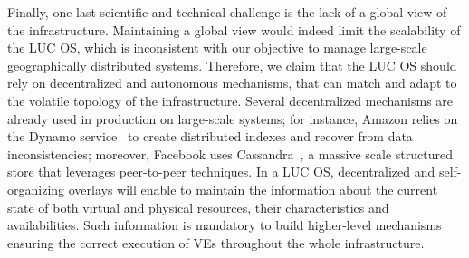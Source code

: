 Finally, one last scientific and
technical challenge is the lack of a global view of the infrastructure.  Maintaining a
global view would indeed limit the scalability of the LUC OS, which is inconsistent with
our objective to manage large-scale geographically distributed systems.  Therefore, we
claim that the LUC OS should rely on decentralized and autonomous mechanisms, that can
match and adapt to the volatile topology of the infrastructure.  Several decentralized
mechanisms are already used in production on large-scale systems; for instance, Amazon
relies on the Dynamo service~\cite{decandia:2007} to create distributed indexes and
recover from data inconsistencies; moreover, Facebook uses Cassandra~\cite{lakshman:2010},
a massive scale structured store that leverages peer-to-peer techniques.
%
%
In a LUC OS, decentralized and self-organizing overlays will enable to maintain the
information about the current state of both virtual and physical resources, their
characteristics and availabilities. Such information is mandatory to build higher-level
mechanisms ensuring the correct execution of VEs throughout the whole infrastructure.

